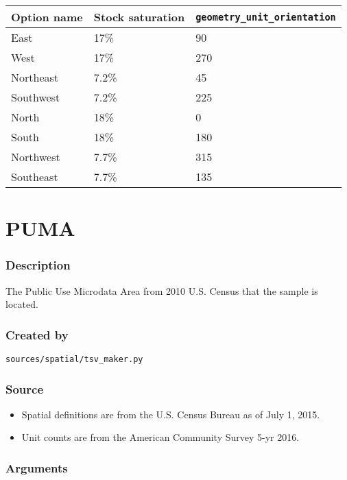 \begin{longtable}[]{@{}lll@{}}
\toprule\noalign{}
Option name & Stock saturation & \texttt{geometry\_unit\_orientation} \\
\midrule\noalign{}
\endhead
\bottomrule\noalign{}
\endlastfoot
East & 17\% & 90 \\
West & 17\% & 270 \\
Northeast & 7.2\% & 45 \\
Southwest & 7.2\% & 225 \\
North & 18\% & 0 \\
South & 18\% & 180 \\
Northwest & 7.7\% & 315 \\
Southeast & 7.7\% & 135 \\
\end{longtable}



\section{PUMA}\label{puma}

\subsubsection{Description}\label{description-125}

The Public Use Microdata Area from 2010 U.S. Census that the sample is
located.

\subsubsection{Created by}\label{created-by-126}

\texttt{sources/spatial/tsv\_maker.py}

\subsubsection{Source}\label{source-128}

\begin{itemize}
 
\item
  Spatial definitions are from the U.S. Census Bureau as of July 1,
  2015.
\item
  Unit counts are from the American Community Survey 5-yr 2016.
\end{itemize}

\subsubsection{Arguments}\label{arguments-89}


